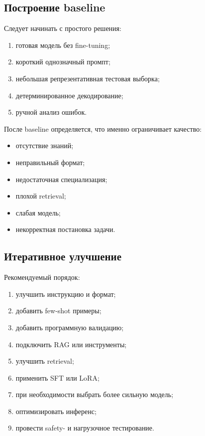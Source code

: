 \documentclass[12pt,a4paper]{article}
\newcommand{\1}{\mathbf{1}}
\theoremstyle{definition}
\theoremstyle{remark}
\begin{document}
\subsection{Построение baseline}

Следует начинать с простого решения:

\begin{enumerate}
    \item готовая модель без fine-tuning;
    \item короткий однозначный промпт;
    \item небольшая репрезентативная тестовая выборка;
    \item детерминированное декодирование;
    \item ручной анализ ошибок.
\end{enumerate}

После baseline определяется, что именно ограничивает качество:

\begin{itemize}
    \item отсутствие знаний;
    \item неправильный формат;
    \item недостаточная специализация;
    \item плохой retrieval;
    \item слабая модель;
    \item некорректная постановка задачи.
\end{itemize}

\subsection{Итеративное улучшение}

Рекомендуемый порядок:

\begin{enumerate}
    \item улучшить инструкцию и формат;
    \item добавить few-shot примеры;
    \item добавить программную валидацию;
    \item подключить RAG или инструменты;
    \item улучшить retrieval;
    \item применить SFT или LoRA;
    \item при необходимости выбрать более сильную модель;
    \item оптимизировать инференс;
    \item провести safety- и нагрузочное тестирование.
\end{enumerate}
\end{document}
